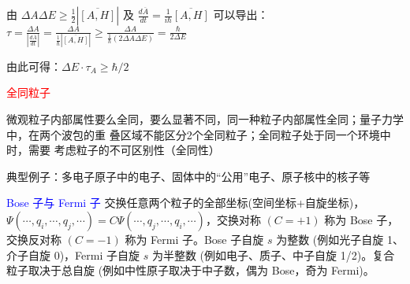 \documentclass[a4paper,8pt]{extarticle} %
\newcommand{\bluetext}[1]{\textcolor{blue}{#1}}
\newcommand{\redtext}[1]{\textcolor{red}{#1}}
\begin{document}
\begin{multicols}{3}
由 $\Delta A\Delta E \geq \frac{1}{2}|\overline{[A,H]}|$ 及 $\frac{d\overline{A}}{dt}=\frac{1}{i\hbar}\overline{[A,H]}$ 可以导出：
$\tau = \frac{\Delta A}{|\frac{d\overline{A}}{dt}|} = \frac{\Delta A}{\frac{1}{\hbar}|\overline{[A,H]}|} \geq \frac{\Delta A}{\frac{1}{\hbar}(2\Delta A\Delta E)} = \frac{\hbar}{2\Delta E}$

由此可得：$\Delta E \cdot \tau_A \geq \hbar/2$

\redtext{全同粒子}

微观粒子内部属性要么全同，要么显著不同，同一种粒子内部属性全同；量子力学中，在两个波包的重
叠区域不能区分2个全同粒子；全同粒子处于同一个环境中时，需要
考虑粒子的不可区别性（全同性）

典型例子：多电子原子中的电子、固体中的“公用”电子、原子核中的核子等

\bluetext{Bose 子与 Fermi 子}
交换任意两个粒子的全部坐标(空间坐标+自旋坐标)，$\Psi(\cdots,q_i,\cdots,q_j,\cdots)=C\Psi(\cdots,q_j,\cdots,q_i,\cdots)$，交换对称 $(C=+1)$ 称为 Bose 子，交换反对称 $(C=-1)$ 称为 Fermi 子。Bose 子自旋 $s$ 为整数 (例如光子自旋 1、介子自旋 0)，Fermi 子自旋 $s$ 为半整数 (例如电子、质子、中子自旋 1/2)。复合粒子取决于总自旋 (例如中性原子取决于中子数，偶为 Bose，奇为 Fermi)。


\end{multicols}
\end{document}
